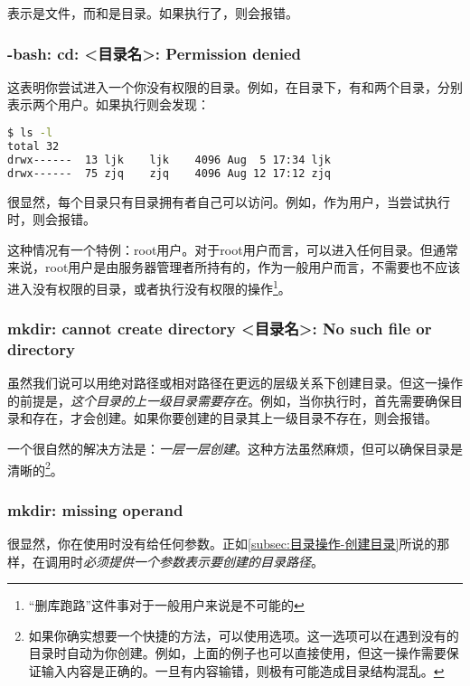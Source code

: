 表示是文件，而和是目录。如果执行了，则会报错。

\subsubsection{-bash: cd: <目录名>: Permission denied}

这表明你尝试进入一个你没有权限的目录。例如，在目录下，有和两个目录，分别表示两个用户。如果执行则会发现：

\begin{lstlisting}[language=bash]
$ ls -l
total 32
drwx------  13 ljk    ljk    4096 Aug  5 17:34 ljk
drwx------  75 zjq    zjq    4096 Aug 12 17:12 zjq
\end{lstlisting}

很显然，每个目录只有目录拥有者自己可以访问。例如，作为用户，当尝试执行时，则会报错。

\begin{extend}
    这种情况有一个特例：root用户。对于root用户而言，可以进入任何目录。但通常来说，root用户是由服务器管理者所持有的，作为一般用户而言，不需要也不应该进入没有权限的目录，或者执行没有权限的操作\footnote{“删库跑路”这件事对于一般用户来说是不可能的}。
\end{extend}

\subsubsection{mkdir: cannot create directory <目录名>: No such file or directory}

虽然我们说可以用绝对路径或相对路径在更远的层级关系下创建目录。但这一操作的前提是，\emph{这个目录的上一级目录需要存在}。例如，当你执行时，首先需要确保目录和存在，才会创建。如果你要创建的目录其上一级目录不存在，则会报错。

一个很自然的解决方法是：\emph{一层一层创建}。这种方法虽然麻烦，但可以确保目录是清晰的\footnote{如果你确实想要一个快捷的方法，可以使用选项。这一选项可以在遇到没有的目录时自动为你创建。例如，上面的例子也可以直接使用，但这一操作需要保证输入内容是正确的。一旦有内容输错，则极有可能造成目录结构混乱。}。

\subsubsection{mkdir: missing operand}

很显然，你在使用时没有给任何参数。正如\ref{subsec:目录操作-创建目录}所说的那样，在调用时\emph{必须提供一个参数表示要创建的目录路径}。